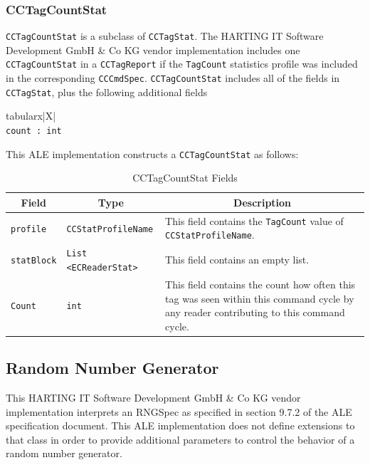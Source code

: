 \documentclass[11pt,a4paper,oneside]{article}
\newenvironment{bbox}%
{\begin{table}[h!]\begin{threeparttable}}%
{\end{threeparttable}\end{table}\FloatBarrier}
\newenvironment{bbox}
{\ifvmode\IgnorePar\fi \EndP\Tg<div class='bbox'>}{\Tg</div>\IgnoreIndent}
\begin{document}
\subsubsection{CCTagCountStat}
\texttt{CCTagCountStat} is a subclass of \texttt{CCTagStat}. The HARTING IT Software Development GmbH \& Co KG vendor implementation includes one\\ \texttt{CCTagCountStat} in a \texttt{CCTagReport} if the \texttt{TagCount} statistics profile was included in the corresponding \texttt{CCCmdSpec}. \texttt{CCTagCountStat} includes all of the fields in \texttt{CCTagStat}, plus the following additional fields

\begin{bbox}
\begin{edtable}{tabularx}{\linewidth}{|X|}
\hline 
{}
\\
\texttt{count : int}\\
\hline
\end{edtable}
\end{bbox}

This ALE implementation constructs a \texttt{CCTagCountStat} as follows:
 
\begin{table}[!h]
\begin{tabularx}{\linewidth}{|l|l|X|}
\hline
\multicolumn{1}{|c|}{\textbf{Field}}&
\multicolumn{1}{c|}{\textbf{Type}}&
\multicolumn{1}{c|}{\textbf{Description}}\\
\hline
\texttt{profile}&\texttt{CCStatProfileName}&This field contains the \texttt{TagCount} value of \texttt{CCStatProfileName}.\\
\hline
\texttt{statBlock}&\texttt{List <ECReaderStat>}&This field contains an empty list.\\
\hline
\texttt{Count}&\texttt{int}&This field contains the count how often this tag was seen within this command cycle by any reader contributing to this command cycle.\\
\hline
\end{tabularx}
\caption{CCTagCountStat   Fields}
\MakeLineNo
\end{table}
\FloatBarrier

\subsection{Random Number Generator}
This HARTING IT Software Development GmbH \& Co KG vendor implementation interprets an RNGSpec as specified in section 9.7.2 of the ALE specification document. This ALE implementation does not define extensions to that class in order to provide additional parameters to control the behavior of a random number generator.
\fi
\end{document}
